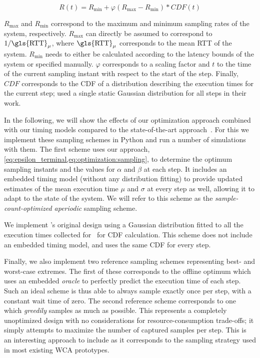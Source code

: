 \begin{equation}
    R(t) = R_\text{min} + \varphi\left( R_\text{max} - R_\text{min} \right) * CDF(t)
\end{equation}

\( R_\text{max} \) and \( R_\text{min} \) correspond to the maximum and minimum sampling rates of the system, respectively.
\( R_\text{max} \) can directly be assumed to correspond to \( 1 / \text{\gls{RTT}}_\mu \), where \( \text{\gls{RTT}}_\mu \) corresponds to the mean \gls{RTT} of the system.
\( R_\text{min} \) needs to either be calculated according to the latency bounds of the system or specified manually.
\( \varphi \) corresponds to a scaling factor and \( t \) to the time of the current sampling instant with respect to the start of the step.
Finally, \( CDF \) corresponds to the \gls{CDF} of a distribution describing the execution times for the current step; \citeauthor{wang2019towards} used a single static Gaussian distribution for all steps in their work.

\medskip

In the following, we will show the effects of our optimization approach combined with our timing models compared to the state-of-the-art approach~\cite{wang2019towards}.
For this we implement these sampling schemes in Python and run a number of simulations with them.
The first scheme uses our approach, \cref{eq:epsilon_terminal,eq:optimization:sampling}, to determine the optimum sampling instants and the values for \( \alpha \) and \( \beta \) at each step.
It includes an embedded timing model (without any distribution fitting) to provide updated estimates of the mean execution time \( \mu \) and \( \sigma \) at every step as well, allowing it to adapt to the state of the system.
We will refer to this scheme as the \emph{sample-count-optimized aperiodic} sampling scheme.

We implement \citeauthor{wang2019towards}'s original design using a Gaussian distribution fitted to all the execution times collected for~\cite{olguinmunoz2021impact} for \gls{CDF} calculation.
This scheme does not include an embedded timing model, and uses the same \gls{CDF} for every step.

Finally, we also implement two reference sampling schemes representing best- and worst-case extremes.
The first of these corresponds to the offline optimum which uses an embedded \emph{oracle} to perfectly predict the execution time of each step.
Such an ideal scheme is thus able to always sample exactly once per step, with a constant wait time of zero.
The second reference scheme corresponds to one which \emph{greedily} samples as much as possible.
This represents a completely unoptimized design with no considerations for resource-consumption trade-offs; it simply attempts to maximize the number of captured samples per step.
This is an interesting approach to include as it corresponds to the sampling strategy used in most existing \gls{WCA} prototypes.

